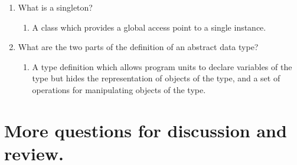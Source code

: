 \begin{enumerate}
\begin{answer}
\begin{enumerate}
    \end{enumerate}

    \end{answer}
  \item What is a singleton?

  
    \begin{answer}

    \begin{enumerate}
    \item A class which provides a global access point to a single instance.  
    \end{enumerate}

    \end{answer}

  \item What are the two parts of the definition 
    of an abstract data type?

    \begin{answer}

    \begin{enumerate}
    \item A type definition which allows program units to declare variables of the 
type but hides the representation of objects of the type, and a set of operations 
for manipulating objects of the type.
 
    \end{enumerate}

    \end{answer}

  \end{enumerate}



\section{More questions for discussion and review.}

